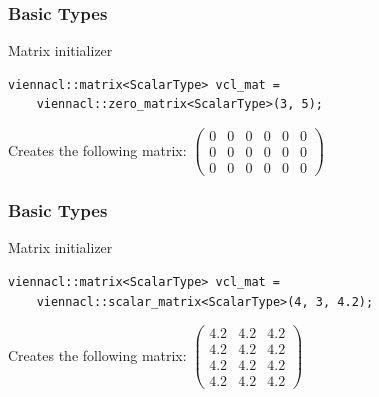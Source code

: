 \begin{frame}[fragile]
\frametitle{Basic Types}

\begin{block}{Matrix initializer}
  \begin{lstlisting}
viennacl::matrix<ScalarType> vcl_mat =
    viennacl::zero_matrix<ScalarType>(3, 5);
  \end{lstlisting}
  
  \hspace{1cm}
  
  Creates the following matrix:
$\begin{pmatrix}
0 & 0 & 0 & 0 & 0 & 0 \\
0 & 0 & 0 & 0 & 0 & 0 \\
0 & 0 & 0 & 0 & 0 & 0
\end{pmatrix}$
\end{block}

\end{frame}



\begin{frame}[fragile]
\frametitle{Basic Types}

\begin{block}{Matrix initializer}
  \begin{lstlisting}
viennacl::matrix<ScalarType> vcl_mat =
    viennacl::scalar_matrix<ScalarType>(4, 3, 4.2);
  \end{lstlisting}
  
  \hspace{1cm}
  
  Creates the following matrix:
$\begin{pmatrix}
4.2 & 4.2 & 4.2 \\
4.2 & 4.2 & 4.2 \\
4.2 & 4.2 & 4.2 \\
4.2 & 4.2 & 4.2
\end{pmatrix}$
\end{block}

\end{frame}



